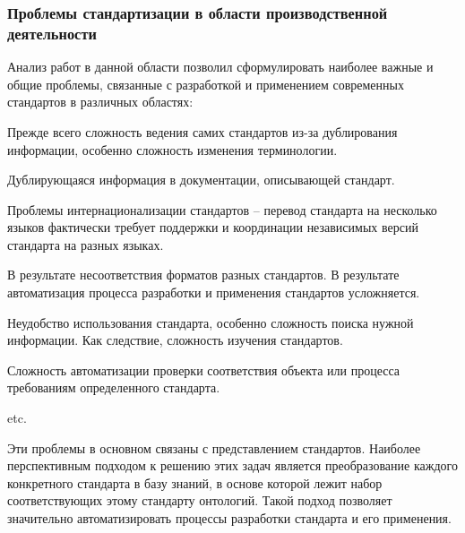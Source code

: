 \subsubsection{Проблемы стандартизации в области производственной деятельности}

Анализ работ в данной области позволил сформулировать наиболее важные и общие проблемы, связанные с разработкой и применением современных стандартов в различных областях:
\begin{textitemize}
    \item Прежде всего сложность ведения самих стандартов из-за дублирования информации, особенно сложность изменения терминологии.
    \item Дублирующаяся информация в документации, описывающей стандарт.
    \item Проблемы интернационализации стандартов -- перевод стандарта на несколько языков фактически требует поддержки и координации независимых версий стандарта на разных языках.
    \item В результате несоответствия форматов разных стандартов. В результате автоматизация процесса разработки и применения стандартов усложняется.
    \item Неудобство использования стандарта, особенно сложность поиска нужной информации. Как следствие, сложность изучения стандартов.
    \item Сложность автоматизации проверки соответствия объекта или процесса требованиям определенного стандарта.
    \item etc.
\end{textitemize}

Эти проблемы в основном связаны с представлением стандартов. Наиболее перспективным подходом к решению этих задач является преобразование каждого конкретного стандарта в базу знаний, в основе которой лежит набор соответствующих этому стандарту онтологий. Такой подход позволяет значительно автоматизировать процессы разработки стандарта и его применения.


